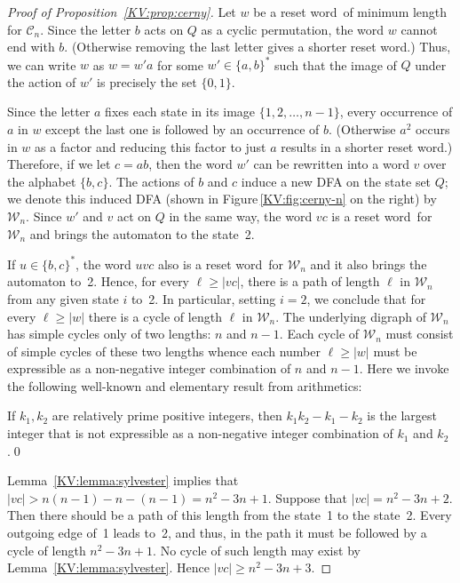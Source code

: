 \documentclass{irmaart}
\newcommand{\sw}{reset word}
\theoremstyle{plain}
\begin{document}
\begin{proof}[Proof of Proposition~\ref{KV:prop:cerny}]
Let $w$ be a \sw\ of minimum length for $\mathcal{C}_n$. Since the
letter $b$ acts on $Q$ as a cyclic permutation, the word $w$
cannot end with $b$. (Otherwise removing the last letter gives a
shorter \sw.) Thus, we can write $w$ as $w = w'a$ for some
$w'\in\{a,b\}^*$ such that the image of $Q$ under the action of
$w'$ is precisely the set $\{0,1\}$.

Since the letter $a$ fixes each state in its image
$\{1,2,\dots,n-1\}$, every occurrence of $a$ in $w$ except the
last one is followed by an occurrence of $b$. (Otherwise $a^2$
occurs in $w$ as a factor and reducing this factor to just $a$
results in a shorter \sw.) Therefore, if we let $c=ab$, then the
word $w'$ can be rewritten into a word $v$ over the alphabet
$\{b,c\}$. The actions of $b$ and $c$ induce a new DFA on the
state set $Q$; we denote this induced DFA (shown in
Figure\,\ref{KV:fig:cerny-n} on the right) by $\mathcal{W}_n$.
Since $w'$ and $v$ act on $Q$ in the same way, the word $vc$ is a
\sw\ for $\mathcal{W}_n$ and brings the automaton to the state~2.

If $u\in\{b,c\}^*$, the word $uvc$ also is a \sw\ for
$\mathcal{W}_n$ and it also brings the automaton to~2. Hence, for
every $\ell\ge|vc|$, there is a path of length $\ell$ in
$\mathcal{W}_n$ from any given state $i$ to~2. In particular,
setting $i=2$, we conclude that for every $\ell\ge|w|$ there is a
cycle of length $\ell$ in $\mathcal{W}_n$. The underlying digraph
of $\mathcal{W}_n$ has simple cycles only of two lengths: $n$ and
$n-1$. Each cycle of $\mathcal{W}_n$ must consist of simple cycles
of these two lengths whence each number $\ell\ge|w|$ must be
expressible as a non-negative integer combination of $n$ and
$n-1$. Here we invoke the following well-known and elementary
result from arithmetics:

\begin{lemma}
\label{KV:lemma:sylvester} If $k_1,k_2$ are relatively prime positive integers,
then $k_1k_2-k_1-k_2$ is the largest integer that is not expressible as a
non-negative integer combination of $k_1$ and $k_2$.\qed
\end{lemma}

Lemma~\ref{KV:lemma:sylvester} implies that
$|vc|>n(n-1)-n-(n-1)=n^2-3n+1$. Suppose that $|vc|=n^2-3n+2$. Then
there should be a path of this length from the state~1 to the
state~2. Every outgoing edge of~1 leads to~2, and thus, in the
path it must be followed by a cycle of length $n^2-3n+1$. No cycle
of such length may exist by Lemma~\ref{KV:lemma:sylvester}. Hence
$|vc|\ge n^2-3n+3$.


\end{proof}
\end{document}
